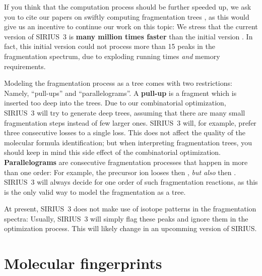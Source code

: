 \documentclass[letterpaper,10pt,openany,oneside]{sphinxmanual}
\begin{document}
If you think that the computation process should be further speeded up, we
ask you to cite our papers on swiftly computing fragmentation trees
\citep{white15speedy, rauf13finding}, as this would give us an incentive to
continue our work on this topic: We stress that the current version of
SIRIUS~3 is \textbf{many million times faster} than the initial version
\citep{boecker08towards}.  In fact, this initial version could not process
more than 15 peaks in the fragmentation spectrum, due to exploding running
times \emph{and} memory requirements.

Modeling the fragmentation process as a tree comes with two restrictions:
Namely, ``pull-ups'' and ``parallelograms''.  A \textbf{pull-up} is a
fragment which is inserted too deep into the trees.  Due to our combinatorial
optimization, SIRIUS~3 will try to generate deep trees, assuming that there
are many small fragmentation steps instead of few larger ones.  SIRIUS~3
will, for example, prefer three consecutive  losses to a
single  loss.  This does not affect the quality of the molecular
formula identification; but when interpreting fragmentation trees, you should
keep in mind this side effect of the combinatorial
optimization.  \textbf{Parallelograms} are consecutive fragmentation
processes that happen in more than one order: For example, the precursor ion
looses  then , \emph{but also}  then .
SIRIUS~3 will always decide for one order of such fragmentation reactions, as
this is the only valid way to model the fragmentation as a tree.

At present, SIRIUS~3 does not make use of isotope patterns in the
fragmentation spectra: Usually, SIRIUS~3 will simply flag these peaks and
ignore them in the optimization process.  This will likely change in an
upcomming version of SIRIUS.


\section{Molecular fingerprints}
\end{document}
